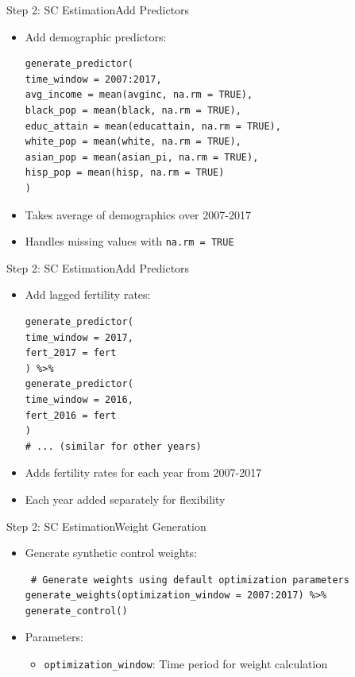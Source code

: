 \documentclass[dvipsnames,hyperref={pdfpagelabels=false}]{beamer}
\begin{document}
\begin{frame}[fragile]{Step 2: SC Estimation}{Add Predictors}
\begin{itemize}
\item Add demographic predictors:
\vspace{0.2cm}
\begin{lstlisting}
generate_predictor(
time_window = 2007:2017,
avg_income = mean(avginc, na.rm = TRUE),
black_pop = mean(black, na.rm = TRUE),
educ_attain = mean(educattain, na.rm = TRUE),
white_pop = mean(white, na.rm = TRUE),
asian_pop = mean(asian_pi, na.rm = TRUE),
hisp_pop = mean(hisp, na.rm = TRUE)
)
\end{lstlisting}
\item Takes average of demographics over 2007-2017
\item Handles missing values with \texttt{na.rm = TRUE}
\end{itemize}
\end{frame}

\begin{frame}[fragile]{Step 2: SC Estimation}{Add Predictors}
\begin{itemize}
\item Add lagged fertility rates:
\vspace{0.2cm}
\begin{lstlisting}
generate_predictor(
time_window = 2017,
fert_2017 = fert
) %>%
generate_predictor(
time_window = 2016,
fert_2016 = fert
)
# ... (similar for other years)
\end{lstlisting}
\item Adds fertility rates for each year from 2007-2017
\item Each year added separately for flexibility
\end{itemize}
\end{frame}

\begin{frame}[fragile]{Step 2: SC Estimation}{Weight Generation}
\begin{itemize}
\item Generate synthetic control weights:
\vspace{0.2cm}
\begin{lstlisting}
 # Generate weights using default optimization parameters
generate_weights(optimization_window = 2007:2017) %>%
generate_control()
\end{lstlisting}
\item Parameters:
\begin{itemize}
\item \texttt{optimization\_window}: Time period for weight calculation
\end{itemize}
\end{itemize}
\end{frame}
\end{document}
